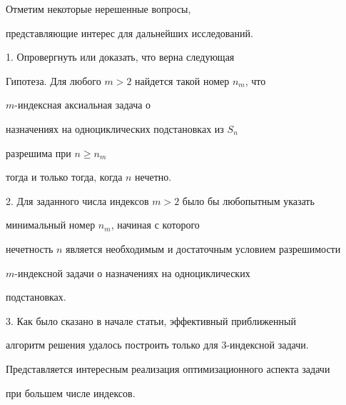 Отметим некоторые нерешенные вопросы, 


представляющие интерес для дальнейших исследований.


\medskip





1. Опровергнуть или доказать, что верна следующая


\medskip





Гипотеза. Для любого $m>2$ найдется такой номер $n_m$, что


$m$-индексная аксиальная задача о


назначениях на одноциклических подстановках из $S_n$


разрешима при $ n\ge n_m$


тогда и только тогда, когда $n$ нечетно.


\medskip





2. Для заданного числа индексов $m>2$ было бы любопытным указать


минимальный номер $n_m$, начиная с которого


нечетность $n$ является необходимым и достаточным условием разрешимости


$m$-индексной задачи о назначениях на одноциклических


подстановках.


\medskip





3. Как было сказано в начале статьи, эффективный приближенный


алгоритм решения удалось построить только для $3$-индексной задачи.


Представляется интересным реализация оптимизационного аспекта задачи


при большем числе индексов.





